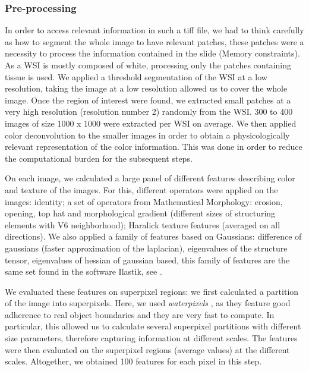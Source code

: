 \documentclass[a4paper,10pt]{article}
\begin{document}
\subsubsection*{Pre-processing}

In order to access relevant information in such a tiff file, we had to think carefully as how to segment the whole image to have relevant patches, these patches were a necessity to process the information contained in the slide (Memory constraints). As a WSI is mostly composed of white, processing only the patches containing tissue is used. We applied a threshold segmentation of the WSI at a low resolution, taking the image at a low resolution allowed us to cover the whole image. Once the region of interest were found, we extracted small patches at a very high resolution (resolution number 2) randomly from the WSI. 300 to 400 images of size 1000 x 1000 were extracted per WSI on average. We then applied color deconvolution \cite{deconvolution} to the smaller images in order to obtain a physicologically relevant representation
of the color information. This was done in order to reduce the
computational burden for the subsequent steps.

On each image, we calculated a large panel of different features describing color
and texture of the images. For this, different operators were applied
on the images: identity; a set of operators from Mathematical
Morphology: erosion, opening, top hat and morphological gradient (different
sizes of structuring elements with V6 neighborhood); Haralick texture
features (averaged on all directions). We also applied a family of features based
on Gaussians: difference of gaussians (faster approximation of the
laplacian), eigenvalues of the structure tensor, eigenvalues of
hessian of gaussian based, this family of features are the same set found in the software Ilastik, see \cite{Ilastik}.

We evaluated these features on superpixel regions: we first calculated
a partition of the image into superpixels. Here, we used
\textit{waterpixels} \cite{waterpixels}, as they feature good
adherence to real object boundaries and they are very fast to
compute.  In particular, this allowed us to calculate several
superpixel partitions with different size parameters, therefore capturing
information at different scales. The features were then evaluated on
the superpixel regions (average values) at the different
scales. Altogether, we obtained 100 features for each pixel in this step. 
\end{document}
